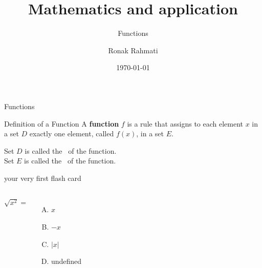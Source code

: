\documentclass{beamer}
\title[Calculus]{Mathematics and application}
\subtitle{Functions}
\author{Ronak Rahmati}
\institute{Czech university of life science}
\date{\today}
\begin{document}
\begin{frame}
   \titlepage 
\end{frame}



\begin{frame}[t]{Functions} \vspace{4pt}
\begin{block}{Definition of a Function}
\vspace{0.5em}
A \textbf{function} $f$ is a rule that assigns to each element $x$ in a set $D$ exactly one element, called $f(x)$, in a set $E$.
\vspace{0.5em}
\end{block}

\vspace{10pt}
Set $D$ is called the
\, of the function.\\[10pt]

Set $E$ is called the
\, of the function.
\end{frame}



\begin{frame}{your very first flash card}\vspace{10pt}
 \begin{columns}[onlytextwidth]
 $\sqrt{x^2}=$ \\[10pt]
   \begin{enumerate}[(A)]
       \item $x$
       \item $-x$
       \item $|x|$
       \item undefined
   \end{enumerate}
\end{columns}
\end{frame}
\end{document}
